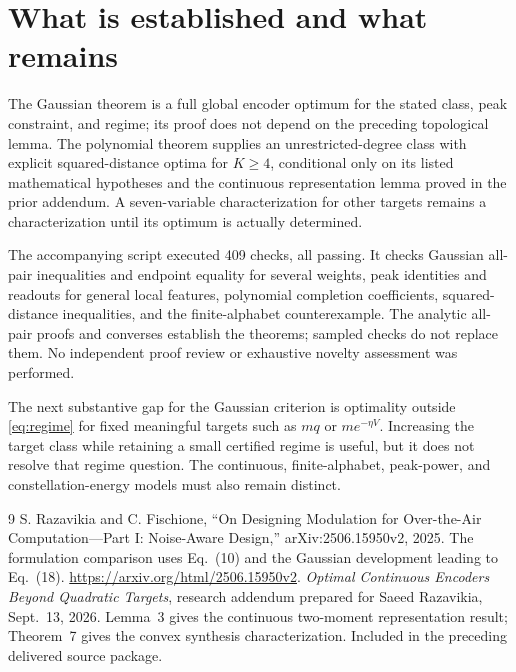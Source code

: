 \documentclass[11pt,letterpaper]{article}
\theoremstyle{remark}
\begin{document}
\section{What is established and what remains}
The Gaussian theorem is a full global encoder optimum for the stated class, peak constraint, and regime; its proof does not depend on the preceding topological lemma. The polynomial theorem supplies an unrestricted-degree class with explicit squared-distance optima for $K\ge4$, conditional only on its listed mathematical hypotheses and the continuous representation lemma proved in the prior addendum. A seven-variable characterization for other targets remains a characterization until its optimum is actually determined.

The accompanying script executed 409 checks, all passing. It checks Gaussian all-pair inequalities and endpoint equality for several weights, peak identities and readouts for general local features, polynomial completion coefficients, squared-distance inequalities, and the finite-alphabet counterexample. The analytic all-pair proofs and converses establish the theorems; sampled checks do not replace them. No independent proof review or exhaustive novelty assessment was performed.

The next substantive gap for the Gaussian criterion is optimality outside \eqref{eq:regime} for fixed meaningful targets such as $m q$ or $m e^{-\eta V}$. Increasing the target class while retaining a small certified regime is useful, but it does not resolve that regime question. The continuous, finite-alphabet, peak-power, and constellation-energy models must also remain distinct.

\begin{thebibliography}{9}
 S. Razavikia and C. Fischione, ``On Designing Modulation for Over-the-Air Computation---Part I: Noise-Aware Design,'' arXiv:2506.15950v2, 2025. The formulation comparison uses Eq.~(10) and the Gaussian development leading to Eq.~(18). \url{https://arxiv.org/html/2506.15950v2}.
 \emph{Optimal Continuous Encoders Beyond Quadratic Targets}, research addendum prepared for Saeed Razavikia, Sept.~13, 2026. Lemma~3 gives the continuous two-moment representation result; Theorem~7 gives the convex synthesis characterization. Included in the preceding delivered source package.
\end{thebibliography}
\end{document}
